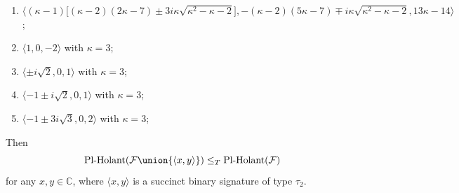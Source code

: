 \documentclass[11pt]{article}
\newcommand{\PlHolant}{\operatorname{Pl-Holant}}
\begin{document}
\begin{lemma}
\begin{enumerate}
  \item $\langle (\kappa - 1) \big[(\kappa - 2) (2 \kappa - 7) \pm 3 i \kappa \sqrt{\kappa^2 - \kappa - 2}\big], -(\kappa - 2) (5 \kappa - 7) \mp i \kappa \sqrt{\kappa^2 - \kappa - 2}, 13 \kappa - 14 \rangle$;%
  \label{case:lem:appendix:k-1k-22k-7pm3ikk2-k-2-k-25k-7mpikk2-k-213k-14}
  
  \item $\langle 1,0,-2 \rangle$ with $\kappa = 3$;
  \label{case:lem:appendix:10-2}
  
  \item $\langle \pm i \sqrt{2}, 0, 1 \rangle$ with $\kappa = 3$;
  \label{case:lem:appendix:pmi201}
  
  \item $\langle -1 \pm i \sqrt{2}, 0, 1 \rangle$ with $\kappa = 3$;
  \label{case:lem:appendix:-1pmi201}
  
  \item $\langle -1 \pm 3 i \sqrt{3}, 0, 2 \rangle$ with $\kappa = 3$;
  \label{case:lem:appendix:-1pm3i302}
  
 \end{enumerate}
 Then
 \[
  \PlHolant(\mathcal{F} \union \{\langle x,y \rangle\}) \le_T \PlHolant(\mathcal{F})
 \]
 for any $x,y \in \mathbb{C}$,
 where $\langle x,y \rangle$ is a succinct binary signature of type $\tau_2$.
\end{lemma}
\end{document}
